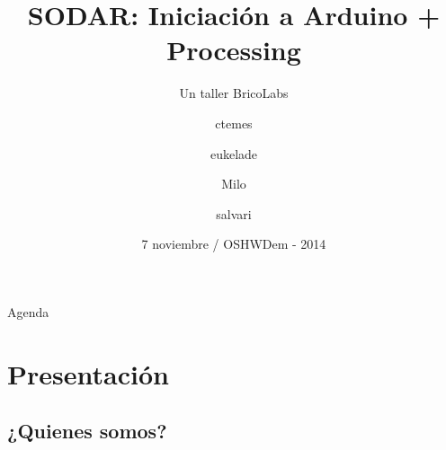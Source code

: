 \documentclass{beamer}
\title[Taller SODAR] %
{SODAR: Iniciación a Arduino + Processing}
\subtitle
{Un taller BricoLabs} %
\author[ctemes, eukelade, milo, salvari] %
{ctemes \and eukelade \and Milo \and salvari}
\institute[BricoLabs] %
{
Asociación BricoLabs 
}
\date[Short Occasion] %
{7 noviembre / OSHWDem - 2014}
\begin{document}
\begin{frame}
  \titlepage
\end{frame}

\begin{frame}{Agenda}
  \tableofcontents
\end{frame}


\section{Presentación}

\subsection{¿Quienes somos?}
\end{document}
